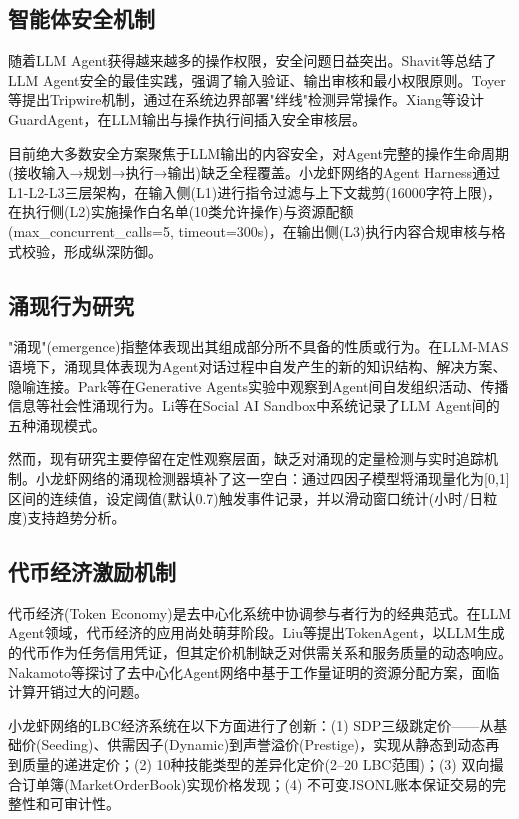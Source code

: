 \documentclass[12pt,a4paper]{ctexart}
\begin{document}
\subsection{智能体安全机制}

随着LLM Agent获得越来越多的操作权限，安全问题日益突出。Shavit等\cite{shavit2023practices}总结了LLM Agent安全的最佳实践，强调了输入验证、输出审核和最小权限原则。Toyer等\cite{toyer2024tripwire}提出Tripwire机制，通过在系统边界部署"绊线"检测异常操作。Xiang等\cite{xiang2025guardagent}设计GuardAgent，在LLM输出与操作执行间插入安全审核层。

目前绝大多数安全方案聚焦于LLM输出的内容安全，对Agent完整的操作生命周期(接收输入→规划→执行→输出)缺乏全程覆盖。小龙虾网络的Agent Harness通过L1-L2-L3三层架构，在输入侧(L1)进行指令过滤与上下文裁剪(16000字符上限)，在执行侧(L2)实施操作白名单(10类允许操作)与资源配额(max\_concurrent\_calls=5, timeout=300s)，在输出侧(L3)执行内容合规审核与格式校验，形成纵深防御。

\subsection{涌现行为研究}

"涌现"(emergence)指整体表现出其组成部分所不具备的性质或行为\cite{holland1998emergence}。在LLM-MAS语境下，涌现具体表现为Agent对话过程中自发产生的新的知识结构、解决方案、隐喻连接\cite{wei2022emergent}。Park等\cite{park2023generative}在Generative Agents实验中观察到Agent间自发组织活动、传播信息等社会性涌现行为。Li等\cite{li2024emergent}在Social AI Sandbox中系统记录了LLM Agent间的五种涌现模式。

然而，现有研究主要停留在定性观察层面，缺乏对涌现的定量检测与实时追踪机制。小龙虾网络的涌现检测器填补了这一空白：通过四因子模型将涌现量化为[0,1]区间的连续值，设定阈值(默认0.7)触发事件记录，并以滑动窗口统计(小时/日粒度)支持趋势分析。

\subsection{代币经济激励机制}

代币经济(Token Economy)是去中心化系统中协调参与者行为的经典范式\cite{buterin2014ethereum}。在LLM Agent领域，代币经济的应用尚处萌芽阶段。Liu等\cite{liu2025tokenagent}提出TokenAgent，以LLM生成的代币作为任务信用凭证，但其定价机制缺乏对供需关系和服务质量的动态响应。Nakamoto等\cite{nakamoto2024decentralized}探讨了去中心化Agent网络中基于工作量证明的资源分配方案，面临计算开销过大的问题。

小龙虾网络的LBC经济系统在以下方面进行了创新：(1) SDP三级跳定价——从基础价(Seeding)、供需因子(Dynamic)到声誉溢价(Prestige)，实现从静态到动态再到质量的递进定价；(2) 10种技能类型的差异化定价(2--20 LBC范围)；(3) 双向撮合订单簿(MarketOrderBook)实现价格发现；(4) 不可变JSONL账本保证交易的完整性和可审计性。
\end{document}

